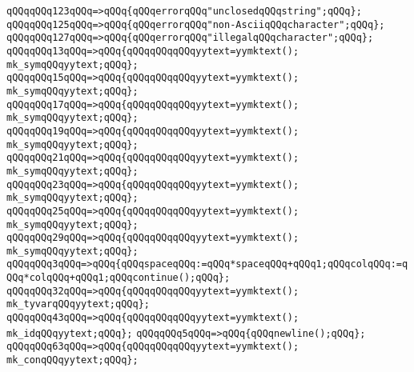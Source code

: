 \verb|qQQqqQQq123qQQq=>qQQq{qQQqerrorqQQq"unclosedqQQqstring";qQQq};|\newline
\verb|qQQqqQQq125qQQq=>qQQq{qQQqerrorqQQq"non-AsciiqQQqcharacter";qQQq};|\newline
\verb|qQQqqQQq127qQQq=>qQQq{qQQqerrorqQQq"illegalqQQqcharacter";qQQq};|\newline
\verb|qQQqqQQq13qQQq=>qQQq{qQQqqQQqqQQqyytext=yymktext();|\newline
\verb|mk_symqQQqyytext;qQQq};|\newline
\verb|qQQqqQQq15qQQq=>qQQq{qQQqqQQqqQQqyytext=yymktext();|\newline
\verb|mk_symqQQqyytext;qQQq};|\newline
\verb|qQQqqQQq17qQQq=>qQQq{qQQqqQQqqQQqyytext=yymktext();|\newline
\verb|mk_symqQQqyytext;qQQq};|\newline
\verb|qQQqqQQq19qQQq=>qQQq{qQQqqQQqqQQqyytext=yymktext();|\newline
\verb|mk_symqQQqyytext;qQQq};|\newline
\verb|qQQqqQQq21qQQq=>qQQq{qQQqqQQqqQQqyytext=yymktext();|\newline
\verb|mk_symqQQqyytext;qQQq};|\newline
\verb|qQQqqQQq23qQQq=>qQQq{qQQqqQQqqQQqyytext=yymktext();|\newline
\verb|mk_symqQQqyytext;qQQq};|\newline
\verb|qQQqqQQq25qQQq=>qQQq{qQQqqQQqqQQqyytext=yymktext();|\newline
\verb|mk_symqQQqyytext;qQQq};|\newline
\verb|qQQqqQQq29qQQq=>qQQq{qQQqqQQqqQQqyytext=yymktext();|\newline
\verb|mk_symqQQqyytext;qQQq};|\newline
\verb|qQQqqQQq3qQQq=>qQQq{qQQqspaceqQQq:=qQQq*spaceqQQq+qQQq1;qQQqcolqQQq:=qQQq*colqQQq+qQQq1;qQQqcontinue();qQQq};|\newline
\verb|qQQqqQQq32qQQq=>qQQq{qQQqqQQqqQQqyytext=yymktext();|\newline
\verb|mk_tyvarqQQqyytext;qQQq};|\newline
\verb|qQQqqQQq43qQQq=>qQQq{qQQqqQQqqQQqyytext=yymktext();|\newline
\verb|mk_idqQQqyytext;qQQq};|\newline
\verb|qQQqqQQq5qQQq=>qQQq{qQQqnewline();qQQq};|\newline
\verb|qQQqqQQq63qQQq=>qQQq{qQQqqQQqqQQqyytext=yymktext();|\newline
\verb|mk_conqQQqyytext;qQQq};|\newline
